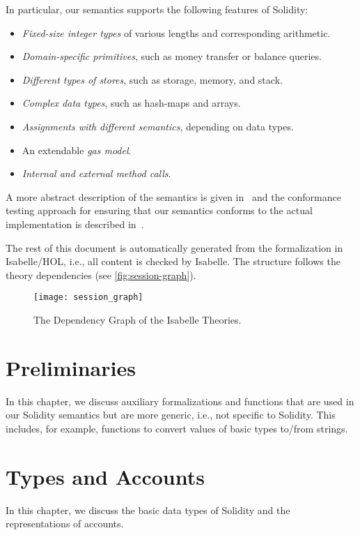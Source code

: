\documentclass[10pt,DIV17,a4paper,abstract=true,twoside=semi,openright]
{scrreprt}
\begin{document}
In particular, our semantics supports the following features of Solidity:
\begin{itemize}
	\item \emph{Fixed-size integer types} of various lengths and corresponding arithmetic.
	\item \emph{Domain-specific primitives}, such as money transfer or balance queries.
	\item \emph{Different types of stores}, such as storage, memory, and stack.
	\item \emph{Complex data types}, such as hash-maps and arrays.
	\item \emph{Assignments with different semantics}, depending on data types.
	\item An extendable \emph{gas model}.
	\item \emph{Internal and external method calls}.
\end{itemize}

A more abstract description of the semantics is given
in~\cite{marmsoler.ea:solidity-semantics:2021} and the conformance testing
approach for ensuring that our semantics conforms to the actual 
implementation is described in~\cite{marmsoler.ea:conformance:2022}.


The rest of this document is automatically generated from the formalization in
Isabelle/HOL, i.e., all content is checked by Isabelle. The structure follows
the theory dependencies (see \autoref{fig:session-graph}).

\begin{figure}
  \centering
  \texttt{[image: session\_graph]}
  \caption{The Dependency Graph of the Isabelle Theories.\label{fig:session-graph}}
\end{figure}

\clearpage
%

\chapter{Preliminaries}
In this chapter, we discuss auxiliary formalizations and functions that
are used in our Solidity semantics but are more generic, i.e., not
specific to Solidity. This includes, for example, functions to convert
values of basic types to/from strings.





\chapter{Types and Accounts}
In this chapter, we discuss the basic data types of Solidity and the
representations of accounts. 
\end{document}
